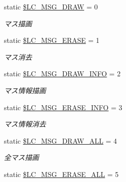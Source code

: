 \begin{DoxyCompactItemize}
static \hyperlink{class_reversi_const_af2cfd84202bbe2dfb22250be713aea65}{\$\+L\+C\+\_\+\+M\+S\+G\+\_\+\+D\+R\+AW} = 0
\begin{DoxyCompactList}\small\item\em マス描画 \end{DoxyCompactList}\item 
\mbox{\label{class_reversi_const_af1e58340af7831eaf0458fe771f51119}} 
static \hyperlink{class_reversi_const_af1e58340af7831eaf0458fe771f51119}{\$\+L\+C\+\_\+\+M\+S\+G\+\_\+\+E\+R\+A\+SE} = 1
\begin{DoxyCompactList}\small\item\em マス消去 \end{DoxyCompactList}\item 
\mbox{\label{class_reversi_const_a522738851ab060cd14ce3ffa1618000e}} 
static \hyperlink{class_reversi_const_a522738851ab060cd14ce3ffa1618000e}{\$\+L\+C\+\_\+\+M\+S\+G\+\_\+\+D\+R\+A\+W\+\_\+\+I\+N\+FO} = 2
\begin{DoxyCompactList}\small\item\em マス情報描画 \end{DoxyCompactList}\item 
\mbox{\label{class_reversi_const_a8ad50be0a297eea01df37fd8ba20d353}} 
static \hyperlink{class_reversi_const_a8ad50be0a297eea01df37fd8ba20d353}{\$\+L\+C\+\_\+\+M\+S\+G\+\_\+\+E\+R\+A\+S\+E\+\_\+\+I\+N\+FO} = 3
\begin{DoxyCompactList}\small\item\em マス情報消去 \end{DoxyCompactList}\item 
\mbox{\label{class_reversi_const_a3074235c57b33980f06e0ec357302e87}} 
static \hyperlink{class_reversi_const_a3074235c57b33980f06e0ec357302e87}{\$\+L\+C\+\_\+\+M\+S\+G\+\_\+\+D\+R\+A\+W\+\_\+\+A\+LL} = 4
\begin{DoxyCompactList}\small\item\em 全マス描画 \end{DoxyCompactList}\item 
\mbox{\label{class_reversi_const_a6c2ec1c0d689ebe57d1ccd9eb9589da8}} 
static \hyperlink{class_reversi_const_a6c2ec1c0d689ebe57d1ccd9eb9589da8}{\$\+L\+C\+\_\+\+M\+S\+G\+\_\+\+E\+R\+A\+S\+E\+\_\+\+A\+LL} = 5

\end{DoxyCompactItemize}
